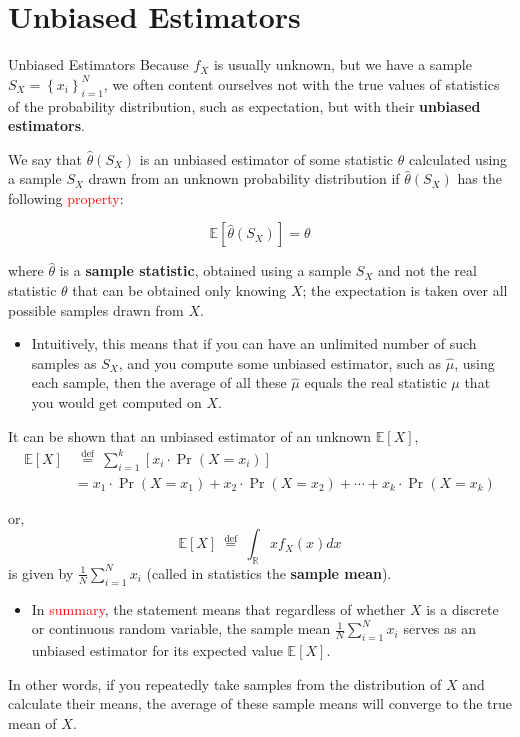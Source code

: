 \documentclass[9pt,dvipsnames]{beamer}
\begin{document}
\section{Unbiased Estimators}
\begin{frame}{Unbiased Estimators}
	Because $f_{X}$ is usually unknown, but we have a sample $S_{X}=\left\{x_{i}\right\}_{i=1}^{N}$, we often content ourselves not with the true values of statistics of the probability distribution, such as expectation, but with their \textbf{unbiased estimators}.
	
	We say that $\hat{\theta}\left(S_{X}\right)$ is an unbiased estimator of some statistic $\theta$ calculated using a sample $S_{X}$ drawn from an unknown probability distribution if $\hat{\theta}\left(S_{X}\right)$ has the following \textcolor{red}{property}:
	
	$$
	\mathbb{E}\left[\hat{\theta}\left(S_{X}\right)\right]=\theta
	$$
	
	where $\hat{\theta}$ is a \textbf{sample statistic}, obtained using a sample $S_{X}$ and not the real statistic $\theta$ that can be obtained only knowing $X$; the expectation is taken over all possible samples drawn from $X$. 
	
	\begin{itemize}
		\item 	Intuitively, this means that if you can have an unlimited number of such samples as $S_{X}$, and you compute some unbiased estimator, such as $\hat{\mu}$, using each sample, then the average of all these $\hat{\mu}$ equals the real statistic $\mu$ that you would get computed on $X$.
	\end{itemize}

\end{frame}

\begin{frame}
	It can be shown that an unbiased estimator of an unknown $\mathbb{E}[X]$, 
	$$
	\begin{aligned}
		\mathbb{E}[X] & \stackrel{\text { def }}{=} \sum_{i=1}^{k}\left[x_{i} \cdot \operatorname{Pr}\left(X=x_{i}\right)\right] \\
		& =x_{1} \cdot \operatorname{Pr}\left(X=x_{1}\right)+x_{2} \cdot \operatorname{Pr}\left(X=x_{2}\right)+\cdots+x_{k} \cdot \operatorname{Pr}\left(X=x_{k}\right)
	\end{aligned}
	$$
	
	or, 
	$$
	\mathbb{E}[X] \stackrel{\text { def }}{=} \int_{\mathbb{R}} x f_{X}(x) d x
	$$
	is given by $\frac{1}{N} \sum_{i=1}^{N} x_{i}$ (called in statistics the\textbf{ sample mean}).
	\begin{itemize}
		\item 	In \textcolor{red}{summary}, the statement means that regardless of whether \(X\) is a discrete or continuous random variable, the sample mean
		\(\frac{1}{N} \sum_{i=1}^{N} x_{i}\) serves as an unbiased estimator for its expected value \(\mathbb{E}[X]\). 
	\end{itemize}
In other words, if you repeatedly take samples from the distribution of \(X\) and calculate their means, the average of these sample means will converge to the true mean of \(X\).
\end{frame}
\end{document}
